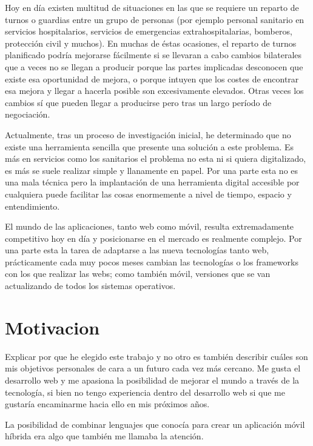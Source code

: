 

Hoy en día existen multitud de situaciones en las que se requiere un reparto de turnos o guardias entre un grupo de personas (por ejemplo personal sanitario en servicios hospitalarios, servicios de emergencias extrahospitalarias, bomberos, protección civil y muchos). En muchas de éstas ocasiones, el reparto de turnos planificado podría mejorarse fácilmente si se llevaran a cabo cambios bilaterales que a veces no se llegan a producir porque las partes implicadas desconocen que existe esa oportunidad de mejora, o porque intuyen que los costes de encontrar esa mejora y llegar a  hacerla posible son excesivamente elevados. Otras veces los cambios sí que pueden llegar a producirse pero tras un largo período de negociación.

Actualmente, tras un proceso de investigación inicial, he determinado que no existe una herramienta sencilla que presente una solución a este problema. Es más en servicios como los sanitarios el problema no esta ni si quiera digitalizado, es más se suele realizar simple y llanamente en papel. Por una parte esta no es una mala técnica pero la implantación de una herramienta digital accesible por cualquiera puede facilitar las cosas enormemente a nivel de tiempo, espacio y entendimiento. 

El mundo de las aplicaciones, tanto web como móvil, resulta extremadamente competitivo hoy en día y posicionarse en el mercado es realmente complejo. Por una parte esta la tarea de adaptarse a las nueva tecnologías tanto web, prácticamente cada muy pocos meses cambian las tecnologías o los frameworks con los que realizar las webs; como también móvil, versiones que se van actualizando de todos los sistemas operativos. 

\section{Motivacion}\label{Motivacion}

Explicar por que he elegido este trabajo y no otro es también describir cuáles son mis objetivos personales de cara a un futuro cada vez más cercano.  Me gusta el desarrollo web y me apasiona la posibilidad de mejorar el mundo a través de la tecnología, si bien no tengo experiencia dentro del desarrollo web si que me gustaría encaminarme hacia ello en mis próximos años.  

La posibilidad de combinar lenguajes que conocía para crear un aplicación  móvil híbrida era algo que también me llamaba la atención.

